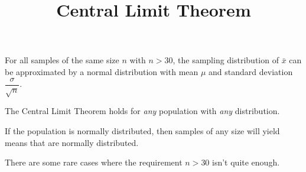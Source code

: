 \documentclass{beamer}
\title[MA205 - Section 6.4]{Central Limit Theorem}
\begin{document}
\begin{frame}
\titlepage
\end{frame}

\begin{frame}
\begin{definition}
For all samples of the same size $n$ with $n>30$, the sampling distribution of $\bar{x}$ can be approximated by a normal distribution with mean $\mu$ and standard deviation $\dfrac{\sigma}{\sqrt{n}}$.
\end{definition}\pause

\begin{note}
The Central Limit Theorem holds for \emph{any} population with \emph{any} distribution.
\end{note}\pause

\begin{note}
If the population is normally distributed, then samples of any size will yield means that are normally distributed.
\end{note}\pause

\begin{note}
There are some rare cases where the requirement $n>30$ isn't quite enough.
\end{note}
\end{frame}
\end{document}
